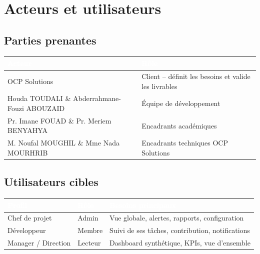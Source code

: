 \documentclass[12pt,a4paper]{article}
\begin{document}
\section{Acteurs et utilisateurs}

\subsection{Parties prenantes}

\begin{center}
\begin{tabularx}{\textwidth}{|L{5.5cm}|X|}
\hline
{}
\textcolor{white}{\textbf{Acteur}} & \textcolor{white}{\textbf{R\^ole}} \\
\hline
OCP Solutions & Client -- d\'efinit les besoins et valide les livrables \\
\hline
{}
Houda TOUDALI \& Abderrahmane-Fouzi ABOUZAID & \'Equipe de d\'eveloppement \\
\hline
Pr. Imane FOUAD \& Pr. Meriem BENYAHYA & Encadrants acad\'emiques \\
\hline
{}
M. Noufal MOUGHIL \& Mme Nada MOURHRIB & Encadrants techniques OCP Solutions \\
\hline
\end{tabularx}
\end{center}

\subsection{Utilisateurs cibles}

\begin{center}
\begin{tabularx}{\textwidth}{|L{3cm}|C{2.5cm}|X|}
\hline
{}
\textcolor{white}{\textbf{Profil}} & \textcolor{white}{\textbf{R\^ole}} & \textcolor{white}{\textbf{Besoins principaux}} \\
\hline
Chef de projet & Admin & Vue globale, alertes, rapports, configuration \\
\hline
{}
D\'eveloppeur & Membre & Suivi de ses t\^aches, contribution, notifications \\
\hline
Manager / Direction & Lecteur & Dashboard synth\'etique, KPIs, vue d'ensemble \\
\hline
\end{tabularx}
\end{center}
\end{document}
